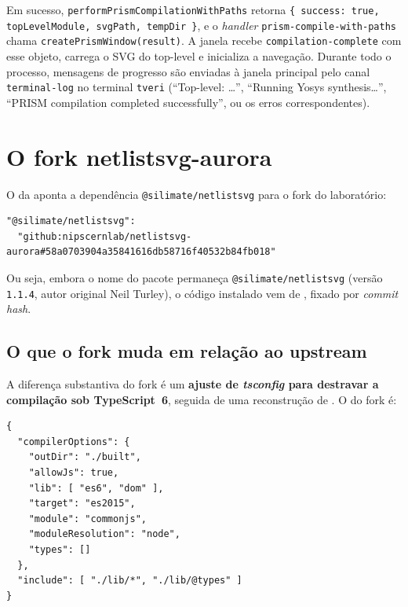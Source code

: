 Em sucesso, \lstinline|performPrismCompilationWithPaths| retorna
\lstinline|{ success: true, topLevelModule, svgPath, tempDir }|, e o \emph{handler}
\lstinline|prism-compile-with-paths| chama \lstinline|createPrismWindow(result)|.
A janela recebe \lstinline|compilation-complete| com esse objeto, carrega o SVG
do top-level e inicializa a navegação. Durante todo o processo, mensagens de
progresso são enviadas à janela principal pelo canal \lstinline|terminal-log| no
terminal \lstinline|tveri| (\enquote{Top-level: \dots}, \enquote{Running Yosys
synthesis\dots}, \enquote{PRISM compilation completed successfully}, ou os erros
correspondentes).

\section{O fork netlistsvg-aurora}
\label{sec:fork}

O  da  aponta a dependência
\lstinline|@silimate/netlistsvg| para o fork do laboratório:

\begin{lstlisting}[caption={Dependência apontando para o fork (package.json da AURORA)}]
"@silimate/netlistsvg":
  "github:nipscernlab/netlistsvg-aurora#58a0703904a35841616db58716f40532b84fb018"
\end{lstlisting}

Ou seja, embora o nome do pacote permaneça \lstinline|@silimate/netlistsvg|
(versão \lstinline|1.1.4|, autor original Neil Turley), o código instalado vem de
, fixado por \emph{commit hash}.

\subsection{O que o fork muda em relação ao upstream}

A diferença substantiva do fork é um \textbf{ajuste de \emph{tsconfig} para
destravar a compilação sob TypeScript~6}, seguida de uma reconstrução de
. O  do fork é:

\begin{lstlisting}[caption={tsconfig.json do fork netlistsvg-aurora}]
{
  "compilerOptions": {
    "outDir": "./built",
    "allowJs": true,
    "lib": [ "es6", "dom" ],
    "target": "es2015",
    "module": "commonjs",
    "moduleResolution": "node",
    "types": []
  },
  "include": [ "./lib/*", "./lib/@types" ]
}
\end{lstlisting}

